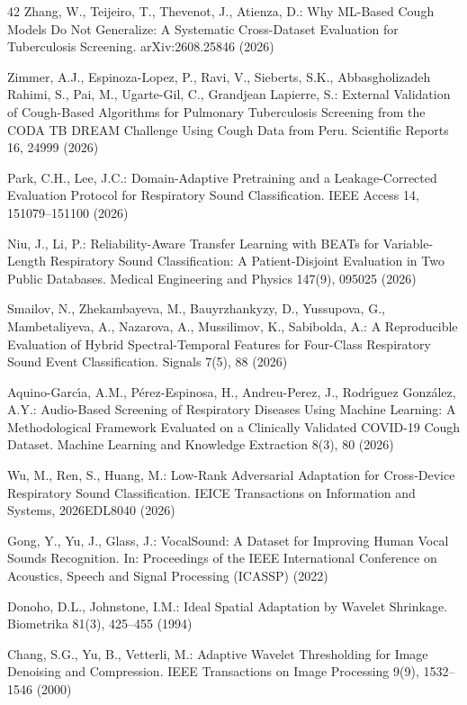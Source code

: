 \documentclass[pdflatex,sn-mathphys-num]{sn-jnl}
\begin{document}
\begin{thebibliography}{42}
Zhang, W., Teijeiro, T., Thevenot, J., Atienza, D.: Why ML-Based Cough Models Do Not Generalize: A Systematic Cross-Dataset Evaluation for Tuberculosis Screening. arXiv:2608.25846 (2026)

Zimmer, A.J., Espinoza-Lopez, P., Ravi, V., Sieberts, S.K., Abbasgholizadeh Rahimi, S., Pai, M., Ugarte-Gil, C., Grandjean Lapierre, S.: External Validation of Cough-Based Algorithms for Pulmonary Tuberculosis Screening from the CODA TB DREAM Challenge Using Cough Data from Peru. Scientific Reports 16, 24999 (2026)

Park, C.H., Lee, J.C.: Domain-Adaptive Pretraining and a Leakage-Corrected Evaluation Protocol for Respiratory Sound Classification. IEEE Access 14, 151079–151100 (2026)

Niu, J., Li, P.: Reliability-Aware Transfer Learning with BEATs for Variable-Length Respiratory Sound Classification: A Patient-Disjoint Evaluation in Two Public Databases. Medical Engineering and Physics 147(9), 095025 (2026)

Smailov, N., Zhekambayeva, M., Bauyrzhankyzy, D., Yussupova, G., Mambetaliyeva, A., Nazarova, A., Mussilimov, K., Sabibolda, A.: A Reproducible Evaluation of Hybrid Spectral-Temporal Features for Four-Class Respiratory Sound Event Classification. Signals 7(5), 88 (2026)

Aquino-Garc{\'\i}a, A.M., P{\'e}rez-Espinosa, H., Andreu-Perez, J., Rodr{\'\i}guez Gonz{\'a}lez, A.Y.: Audio-Based Screening of Respiratory Diseases Using Machine Learning: A Methodological Framework Evaluated on a Clinically Validated COVID-19 Cough Dataset. Machine Learning and Knowledge Extraction 8(3), 80 (2026)

Wu, M., Ren, S., Huang, M.: Low-Rank Adversarial Adaptation for Cross-Device Respiratory Sound Classification. IEICE Transactions on Information and Systems, 2026EDL8040 (2026)

Gong, Y., Yu, J., Glass, J.: VocalSound: A Dataset for Improving Human Vocal Sounds Recognition. In: Proceedings of the IEEE International Conference on Acoustics, Speech and Signal Processing (ICASSP) (2022)

Donoho, D.L., Johnstone, I.M.: Ideal Spatial Adaptation by Wavelet Shrinkage. Biometrika 81(3), 425–455 (1994)

Chang, S.G., Yu, B., Vetterli, M.: Adaptive Wavelet Thresholding for Image Denoising and Compression. IEEE Transactions on Image Processing 9(9), 1532–1546 (2000)


\end{thebibliography}
\end{document}
